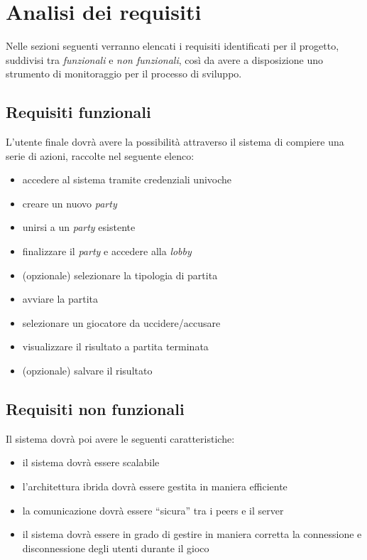 \section{Analisi dei requisiti}
Nelle sezioni seguenti verranno elencati i requisiti identificati per il progetto, suddivisi tra \emph{funzionali} e \emph{non funzionali}, così da avere a disposizione uno strumento di monitoraggio per il processo di sviluppo.

\subsection{Requisiti funzionali}
L'utente finale dovrà avere la possibilità attraverso il sistema di compiere una serie di azioni, raccolte nel seguente elenco:
\begin{itemize}
    \item accedere al sistema tramite credenziali univoche
    \item creare un nuovo \emph{party} \cite{partyWikipedia}
    \item unirsi a un \emph{party} esistente
    \item finalizzare il \emph{party} e accedere alla \emph{lobby} \cite{videogamesWikipedia}
    \item (opzionale) selezionare la tipologia di partita
    \item avviare la partita
    \item selezionare un giocatore da uccidere/accusare
    \item visualizzare il risultato a partita terminata
    \item (opzionale) salvare il risultato
\end{itemize}

\subsection{Requisiti non funzionali}
Il sistema dovrà poi avere le seguenti caratteristiche:
\begin{itemize}
    \item il sistema dovrà essere scalabile
    \item l'architettura ibrida dovrà essere gestita in maniera efficiente
    \item la comunicazione dovrà essere “sicura” tra i peers e il server
    \item il sistema dovrà essere in grado di gestire in maniera corretta la connessione e disconnessione degli utenti durante il gioco
\end{itemize}

